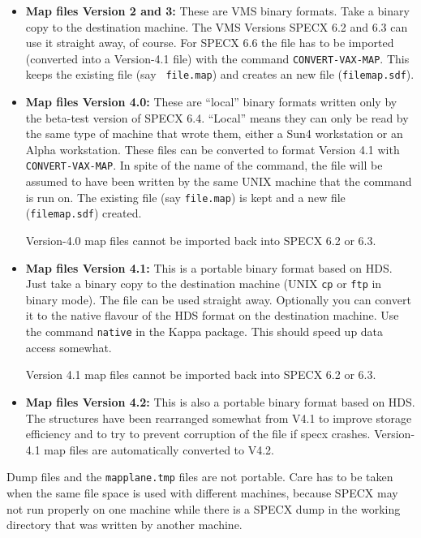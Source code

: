 \documentclass[twoside,11pt]{article}
\renewcommand{\_}{\texttt{\symbol{95}}}
\begin{document}
\begin{itemize}
\item {\bf Map files Version 2 and 3:}
    These are VMS binary formats. Take a binary
    copy to the destination machine. The VMS Versions SPECX 6.2 and 6.3
    can use it straight away, of course. For SPECX 6.6 the file has to
    be imported (converted into a Version-4.1 file) with the command
    {\tt CONVERT-VAX-MAP}. This keeps the existing file (say {\tt
    file.map}) and creates an new file ({\tt file\_map.sdf}).

\item {\bf Map files Version 4.0:}
    These are ``local'' binary formats written only by
    the beta-test version of SPECX 6.4. ``Local'' means they can only be
    read by the same type of machine that wrote them, either a Sun4
    workstation or an Alpha workstation. These files can be converted to
    format Version 4.1 with {\tt CONVERT-VAX-MAP}. In spite of the name of the
    command, the file will be assumed to have been written by the same
    UNIX machine that the command is run on. The existing file (say
    {\tt file.map}) is kept and a new file ({\tt file\_map.sdf}) created.

    Version-4.0 map files cannot be imported back into SPECX 6.2 or 6.3.

\item {\bf Map files Version 4.1:}
    This is a portable binary format based on HDS.
    Just take a binary copy to the destination machine (UNIX {\tt cp} or
    {\tt ftp} in binary mode). The file can be used straight away.
    Optionally you can convert it to the native flavour of the HDS
    format on the destination machine. Use the command {\tt native} in the
    Kappa package. This should speed up data access somewhat.

    Version 4.1 map files cannot be imported back into SPECX 6.2 or 6.3.

\item {\bf Map files Version 4.2:}
    This is also a portable binary format based on HDS. The structures
have been rearranged somewhat from V4.1 to improve storage efficiency
and to try to prevent corruption of the file if specx crashes. Version-4.1 
map files are automatically converted to V4.2.

\end{itemize}

Dump files and the {\tt mapplane.tmp} files are not portable. Care has to
be taken when the same file space is used with different machines,
because SPECX may not run properly on one machine while there is a SPECX
dump in the working directory that was written by another machine.
\end{document}

